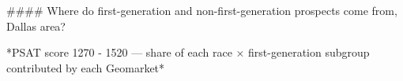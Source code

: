 #### Where do first-generation and non-first-generation prospects come from, Dallas area?

*PSAT score 1270 - 1520 — share of each race × first-generation subgroup contributed by each Geomarket*
